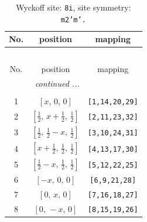 \documentclass[fleqn,8pt]{jsarticle}
\begin{document}
\begin{longtable}{ccc}
\caption{Wyckoff site: {\tt 8i}, site symmetry: {\tt m2'm'.}}
 \\
 \hline \hline
No. & position & mapping \\ \hline \endfirsthead

\multicolumn{2}{l}{\tablename\ \thetable{}} \\
 \hline \hline
No. & position & mapping \\ \hline \endhead

 \hline \hline
\multicolumn{2}{r}{\footnotesize\it continued ...} \\ \endfoot

 \hline \hline
\multicolumn{2}{r}{} \\ \endlastfoot

1 & $\left[ x,\, 0,\, 0 \right]$ & {\tt [1,14,20,29]} \\ \hline
2 & $\left[ \frac{1}{2},\, x + \frac{1}{2},\, \frac{1}{2} \right]$ & {\tt [2,11,23,32]} \\ \hline
3 & $\left[ \frac{1}{2},\, \frac{1}{2} - x,\, \frac{1}{2} \right]$ & {\tt [3,10,24,31]} \\ \hline
4 & $\left[ x + \frac{1}{2},\, \frac{1}{2},\, \frac{1}{2} \right]$ & {\tt [4,13,17,30]} \\ \hline
5 & $\left[ \frac{1}{2} - x,\, \frac{1}{2},\, \frac{1}{2} \right]$ & {\tt [5,12,22,25]} \\ \hline
6 & $\left[ - x,\, 0,\, 0 \right]$ & {\tt [6,9,21,28]} \\ \hline
7 & $\left[ 0,\, x,\, 0 \right]$ & {\tt [7,16,18,27]} \\ \hline
8 & $\left[ 0,\, - x,\, 0 \right]$ & {\tt [8,15,19,26]} \\
\end{longtable}
\renewcommand{\arraystretch}{1.2}
\end{document}
